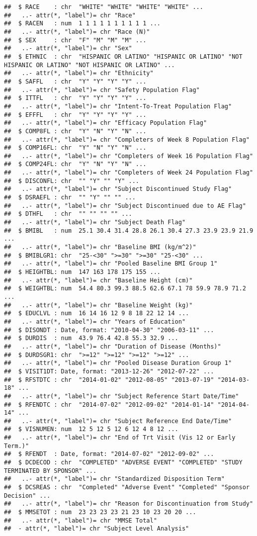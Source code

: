 \documentclass[]{book}
\begin{document}
\begin{verbatim}
##  $ RACE    : chr  "WHITE" "WHITE" "WHITE" "WHITE" ...
##   ..- attr(*, "label")= chr "Race"
##  $ RACEN   : num  1 1 1 1 1 1 1 1 1 1 ...
##   ..- attr(*, "label")= chr "Race (N)"
##  $ SEX     : chr  "F" "M" "M" "M" ...
##   ..- attr(*, "label")= chr "Sex"
##  $ ETHNIC  : chr  "HISPANIC OR LATINO" "HISPANIC OR LATINO" "NOT HISPANIC OR LATINO" "NOT HISPANIC OR LATINO" ...
##   ..- attr(*, "label")= chr "Ethnicity"
##  $ SAFFL   : chr  "Y" "Y" "Y" "Y" ...
##   ..- attr(*, "label")= chr "Safety Population Flag"
##  $ ITTFL   : chr  "Y" "Y" "Y" "Y" ...
##   ..- attr(*, "label")= chr "Intent-To-Treat Population Flag"
##  $ EFFFL   : chr  "Y" "Y" "Y" "Y" ...
##   ..- attr(*, "label")= chr "Efficacy Population Flag"
##  $ COMP8FL : chr  "Y" "N" "Y" "N" ...
##   ..- attr(*, "label")= chr "Completers of Week 8 Population Flag"
##  $ COMP16FL: chr  "Y" "N" "Y" "N" ...
##   ..- attr(*, "label")= chr "Completers of Week 16 Population Flag"
##  $ COMP24FL: chr  "Y" "N" "Y" "N" ...
##   ..- attr(*, "label")= chr "Completers of Week 24 Population Flag"
##  $ DISCONFL: chr  "" "Y" "" "Y" ...
##   ..- attr(*, "label")= chr "Subject Discontinued Study Flag"
##  $ DSRAEFL : chr  "" "Y" "" "" ...
##   ..- attr(*, "label")= chr "Subject Discontinued due to AE Flag"
##  $ DTHFL   : chr  "" "" "" "" ...
##   ..- attr(*, "label")= chr "Subject Death Flag"
##  $ BMIBL   : num  25.1 30.4 31.4 28.8 26.1 30.4 27.3 23.9 23.9 21.9 ...
##   ..- attr(*, "label")= chr "Baseline BMI (kg/m^2)"
##  $ BMIBLGR1: chr  "25-<30" ">=30" ">=30" "25-<30" ...
##   ..- attr(*, "label")= chr "Pooled Baseline BMI Group 1"
##  $ HEIGHTBL: num  147 163 178 175 155 ...
##   ..- attr(*, "label")= chr "Baseline Height (cm)"
##  $ WEIGHTBL: num  54.4 80.3 99.3 88.5 62.6 67.1 78 59.9 78.9 71.2 ...
##   ..- attr(*, "label")= chr "Baseline Weight (kg)"
##  $ EDUCLVL : num  16 14 16 12 9 8 18 22 12 14 ...
##   ..- attr(*, "label")= chr "Years of Education"
##  $ DISONDT : Date, format: "2010-04-30" "2006-03-11" ...
##  $ DURDIS  : num  43.9 76.4 42.8 55.3 32.9 ...
##   ..- attr(*, "label")= chr "Duration of Disease (Months)"
##  $ DURDSGR1: chr  ">=12" ">=12" ">=12" ">=12" ...
##   ..- attr(*, "label")= chr "Pooled Disease Duration Group 1"
##  $ VISIT1DT: Date, format: "2013-12-26" "2012-07-22" ...
##  $ RFSTDTC : chr  "2014-01-02" "2012-08-05" "2013-07-19" "2014-03-18" ...
##   ..- attr(*, "label")= chr "Subject Reference Start Date/Time"
##  $ RFENDTC : chr  "2014-07-02" "2012-09-02" "2014-01-14" "2014-04-14" ...
##   ..- attr(*, "label")= chr "Subject Reference End Date/Time"
##  $ VISNUMEN: num  12 5 12 5 12 6 12 4 8 12 ...
##   ..- attr(*, "label")= chr "End of Trt Visit (Vis 12 or Early Term.)"
##  $ RFENDT  : Date, format: "2014-07-02" "2012-09-02" ...
##  $ DCDECOD : chr  "COMPLETED" "ADVERSE EVENT" "COMPLETED" "STUDY TERMINATED BY SPONSOR" ...
##   ..- attr(*, "label")= chr "Standardized Disposition Term"
##  $ DCSREAS : chr  "Completed" "Adverse Event" "Completed" "Sponsor Decision" ...
##   ..- attr(*, "label")= chr "Reason for Discontinuation from Study"
##  $ MMSETOT : num  23 23 23 23 21 23 10 23 20 20 ...
##   ..- attr(*, "label")= chr "MMSE Total"
##  - attr(*, "label")= chr "Subject Level Analysis"
\end{verbatim}
\end{document}
